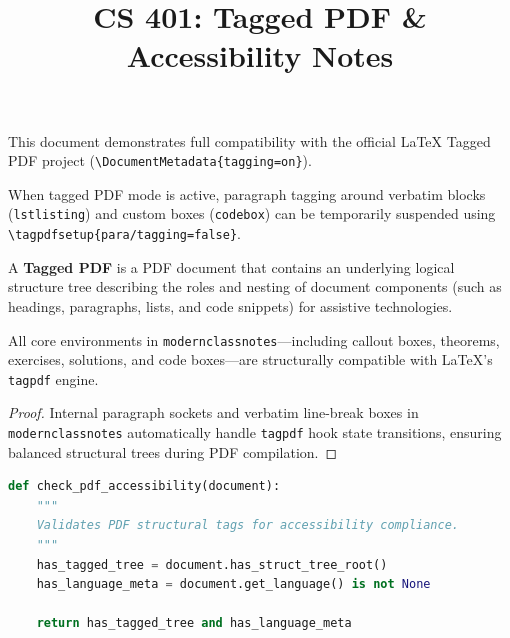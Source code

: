 \documentclass[mode=notes, palette=ocean, fontsize=11pt]{modernclassnotes}
\title{CS 401: Tagged PDF \& Accessibility Notes}
\begin{document}
\maketitle

\tableofcontents
\newpage


This document demonstrates full compatibility with the official \LaTeX{} Tagged PDF project (\texttt{\textbackslash DocumentMetadata\{tagging=on\}}).

When tagged PDF mode is active, paragraph tagging around verbatim blocks (\texttt{lstlisting}) and custom boxes (\texttt{codebox}) can be temporarily suspended using \texttt{\textbackslash tagpdfsetup\{para/tagging=false\}}.

\begin{definition}
A \textbf{Tagged PDF} is a PDF document that contains an underlying logical structure tree describing the roles and nesting of document components (such as headings, paragraphs, lists, and code snippets) for assistive technologies.
\end{definition}

\begin{theorem}
All core environments in \texttt{modernclassnotes}—including callout boxes, theorems, exercises, solutions, and code boxes—are structurally compatible with \LaTeX{}'s \texttt{tagpdf} engine.
\end{theorem}

\begin{proof}
Internal paragraph sockets and verbatim line-break boxes in \texttt{modernclassnotes} automatically handle \texttt{tagpdf} hook state transitions, ensuring balanced structural trees during PDF compilation.
\end{proof}

\begin{codebox}
\begin{lstlisting}[language=Python]
def check_pdf_accessibility(document):
    """
    Validates PDF structural tags for accessibility compliance.
    """
    has_tagged_tree = document.has_struct_tree_root()
    has_language_meta = document.get_language() is not None
    
    return has_tagged_tree and has_language_meta
\end{lstlisting}
\end{codebox}
\end{document}
